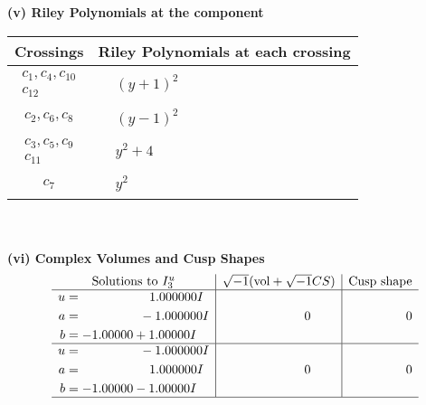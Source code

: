 \documentclass[1p]{elsarticle_modified}
\theoremstyle{definition}
\newcommand{\I}{\sqrt{-1}}
\begin{document}
\newpage\renewcommand{\arraystretch}{1}
\flushleft \textbf{(v) Riley Polynomials at the component}\newline \\
\begin{tabular}{m{50pt}|m{274pt}}
Crossings & \hspace{64pt}Riley Polynomials at each crossing \\
\hline $$\begin{aligned}c_{1},c_{4},c_{10}\\c_{12}\end{aligned}$$&$\begin{aligned}
&(y+1)^2
\end{aligned}$\\
\hline $$\begin{aligned}c_{2},c_{6},c_{8}\end{aligned}$$&$\begin{aligned}
&(y-1)^2
\end{aligned}$\\
\hline $$\begin{aligned}c_{3},c_{5},c_{9}\\c_{11}\end{aligned}$$&$\begin{aligned}
&y^2+4
\end{aligned}$\\
\hline $$\begin{aligned}c_{7}\end{aligned}$$&$\begin{aligned}
&y^2
\end{aligned}$\\
\hline
\end{tabular}\\~\\
\newpage\flushleft \textbf{(vi) Complex Volumes and Cusp Shapes}
$$\begin{array}{c|c|c}  
\text{Solutions to }I^u_{3}& \I (\text{vol} + \sqrt{-1}CS) & \text{Cusp shape}\\
 \hline 
\begin{aligned}
u &= \phantom{-0.000000 -}1.000000 I \\
a &= \phantom{-0.000000 } -1.000000 I \\
b &= -1.00000 + 1.00000 I\end{aligned}
 & \phantom{-0.000000 } 0 & \phantom{-0.000000 } 0 \\ \hline\begin{aligned}
u &= \phantom{-0.000000 } -1.000000 I \\
a &= \phantom{-0.000000 -}1.000000 I \\
b &= -1.00000 - 1.00000 I\end{aligned}
 & \phantom{-0.000000 } 0 & \phantom{-0.000000 } 0\\
 \hline 
 \end{array}$$\newpage\newpage\renewcommand{\arraystretch}{1}
\end{document}
